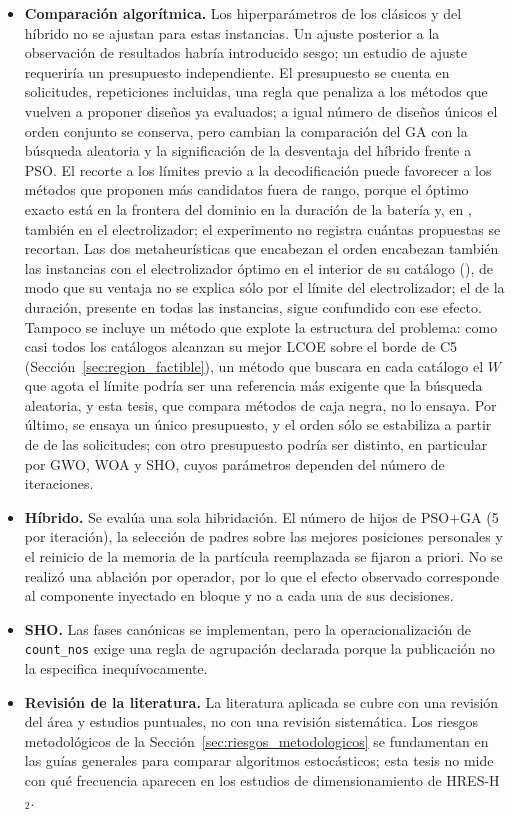 \begin{itemize}
    \item \textbf{Comparación algorítmica.} Los hiperparámetros de los clásicos y del híbrido no se ajustan para estas instancias. Un ajuste posterior a la observación de resultados habría introducido sesgo; un estudio de ajuste requeriría un presupuesto independiente. El presupuesto se cuenta en solicitudes, repeticiones incluidas, una regla que penaliza a los métodos que vuelven a proponer diseños ya evaluados; a igual número de diseños únicos el orden conjunto se conserva, pero cambian la comparación del GA con la búsqueda aleatoria y la significación de la desventaja del híbrido frente a PSO. El recorte a los límites previo a la decodificación puede favorecer a los métodos que proponen más candidatos fuera de rango, porque el óptimo exacto está en la frontera del dominio en la duración de la batería y, en \BoundaryUnitsInstances{}, también en el electrolizador; el experimento no registra cuántas propuestas se recortan. Las dos metaheurísticas que encabezan el orden encabezan también las instancias con el electrolizador óptimo en el interior de su catálogo (\InteriorUnitsLeaders), de modo que su ventaja no se explica sólo por el límite del electrolizador; el de la duración, presente en todas las instancias, sigue confundido con ese efecto. Tampoco se incluye un método que explote la estructura del problema: como casi todos los catálogos alcanzan su mejor LCOE sobre el borde de C5 (Sección~\ref{sec:region_factible}), un método que buscara en cada catálogo el $W$ que agota el límite podría ser una referencia más exigente que la búsqueda aleatoria, y esta tesis, que compara métodos de caja negra, no lo ensaya. Por último, se ensaya un único presupuesto, y el orden sólo se estabiliza a partir de \ConvSettleFrom{} de las \RequestsPerRun{} solicitudes; con otro presupuesto podría ser distinto, en particular por GWO, WOA y SHO, cuyos parámetros dependen del número de iteraciones.
    \item \textbf{Híbrido.} Se evalúa una sola hibridación. El número de hijos de PSO+GA (5 por iteración), la selección de padres sobre las mejores posiciones personales y el reinicio de la memoria de la partícula reemplazada se fijaron a priori. No se realizó una ablación por operador, por lo que el efecto observado corresponde al componente inyectado en bloque y no a cada una de sus decisiones.
    \item \textbf{SHO.} Las fases canónicas se implementan, pero la operacionalización de \texttt{count\_nos} exige una regla de agrupación declarada porque la publicación no la especifica inequívocamente.
    \item \textbf{Revisión de la literatura.} La literatura aplicada se cubre con una revisión del área y estudios puntuales, no con una revisión sistemática. Los riesgos metodológicos de la Sección~\ref{sec:riesgos_metodologicos} se fundamentan en las guías generales para comparar algoritmos estocásticos; esta tesis no mide con qué frecuencia aparecen en los estudios de dimensionamiento de HRES-H$_2$.
\end{itemize}

